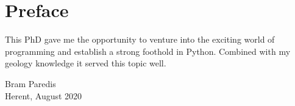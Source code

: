 \chapter*{Preface}\label{ch:preface}

This PhD gave me the opportunity to venture into the exciting world of programming and establish a strong foothold in Python. %
Combined with my geology knowledge it served this topic well.

\begin{flushright}
    Bram Paredis \\
    Herent, August 2020
\end{flushright}

\instructionspreface


\cleardoublepage

